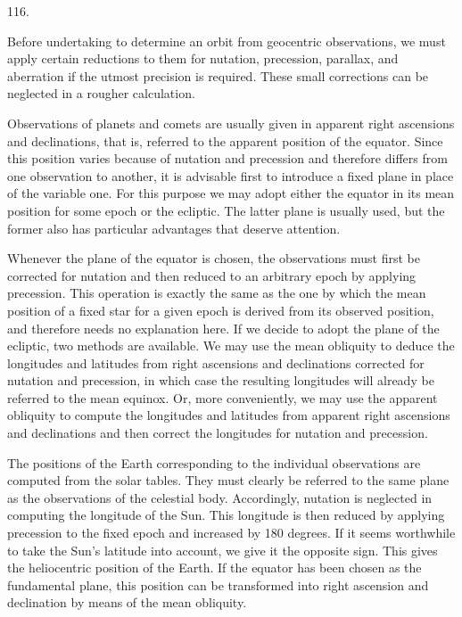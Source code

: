 \par\medskip
\begin{center}\hypertarget{native-163-article116}{}116.\end{center}
Before undertaking to determine an orbit from geocentric observations, we must apply certain reductions to them for nutation, precession, parallax, and aberration if the utmost precision is required. These small corrections can be neglected in a rougher calculation.

Observations of planets and comets are usually given in apparent right ascensions and declinations, that is, referred to the apparent position of the equator. Since this position varies because of nutation and precession and therefore differs from one observation to another, it is advisable first to introduce a fixed plane in place of the variable one. For this purpose we may adopt either the equator in its mean position for some epoch or the ecliptic. The latter plane is usually used, but the former also has particular advantages that deserve attention.

Whenever the plane of the equator is chosen, the observations must first be corrected for nutation and then reduced to an arbitrary epoch by applying precession. This operation is exactly the same as the one by which the mean position of a fixed star for a given epoch is derived from its observed position, and therefore needs no explanation here. If we decide to adopt the plane of the ecliptic, two methods are available. We may use the mean obliquity to deduce the longitudes and latitudes from right ascensions and declinations corrected for nutation and precession, in which case the resulting longitudes will already be referred to the mean equinox. Or, more conveniently, we may use the apparent obliquity to compute the longitudes and latitudes from apparent right ascensions and declinations and then correct the longitudes for nutation and precession.

The positions of the Earth corresponding to the individual observations are computed from the solar tables. They must clearly be referred to the same plane as the observations of the celestial body. Accordingly, nutation is neglected in computing the longitude of the Sun. This longitude is then reduced by applying precession to the fixed epoch and increased by 180 degrees. If it seems worthwhile to take the Sun's latitude into account, we give it the opposite sign. This gives the heliocentric position of the Earth. If the equator has been chosen as the fundamental plane, this position can be transformed into right ascension and declination by means of the mean obliquity.
